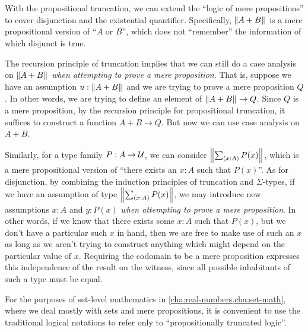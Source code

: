 With the propositional truncation, we can extend the ``logic of mere propositions'' to cover disjunction and the existential quantifier.
Specifically, $\mathopen{}\left\Vert A+B\right\Vert_{}\mathclose{}$ is a mere propositional version of ``$A$ or $B$'', which does not ``remember'' the information of which disjunct is true.

The recursion principle of truncation implies that we can still do a case analysis on $\mathopen{}\left\Vert A+B\right\Vert_{}\mathclose{}$ \emph{when attempting to prove a mere proposition}.
That is, suppose we have an assumption $u:\mathopen{}\left\Vert A+B\right\Vert_{}\mathclose{}$ and we are trying to prove a mere proposition $Q$.
In other words, we are trying to define an element of $\mathopen{}\left\Vert A+B\right\Vert_{}\mathclose{} \to Q$.
Since $Q$ is a mere proposition, by the recursion principle for propositional truncation, it suffices to construct a function $A+B\to Q$.
But now we can use case analysis on $A+B$.

Similarly, for a type family $P:A\to\mathcal{U}$, we can consider $\brck{\sm{x:A} P(x)}$, which is a mere propositional version of ``there exists an $x:A$ such that $P(x)$''.
As for disjunction, by combining the induction principles of truncation and $\Sigma$-types, if we have an assumption of type $\brck{\sm{x:A} P(x)}$, we may introduce new assumptions $x:A$ and $y:P(x)$ \emph{when attempting to prove a mere proposition}.
In other words, if we know that there exists some $x:A$ such that $P(x)$, but we don't have a particular such $x$ in hand, then we are free to make use of such an $x$ as long as we aren't trying to construct anything which might depend on the particular value of $x$.
Requiring the codomain to be a mere proposition expresses this independence of the result on the witness, since all possible inhabitants of such a type must be equal.

For the purposes of set-level mathematics in \autoref{cha:real-numbers,cha:set-math},
where we deal mostly with sets and mere propositions, it is convenient to use the
traditional logical notations to refer only to ``propositionally truncated logic''.

